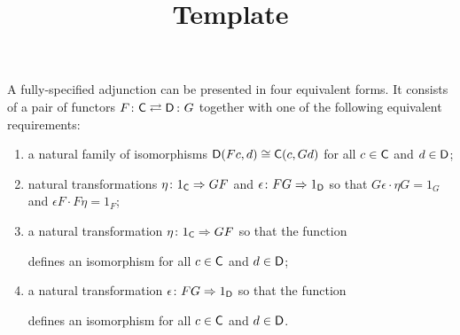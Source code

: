 \documentclass[../../solutions]{subfiles}
\title{Template}
\author{}
\begin{document}
\maketitle

\begin{remark}
  A fully-specified adjunction can be presented in four equivalent
  forms.  It consists of a pair of functors $\afunc{F}{G}{\sC}{\sD}$
  together with one of the following equivalent requirements:
  \begin{enumerate}[label=(\roman*)]
  \item a natural family of isomorphisms ${\mathsf{D}}(Fc,d)\cong {\mathsf{C}}(c,Gd)$
    for all $c\in{\mathsf{C}}$ and $d\in{\mathsf{D}}$;
  \item natural transformations ${\eta}\colon{1_{\mathsf{C}}}\Rightarrow{GF}$ and
    ${\epsilon}\colon{FG}\Rightarrow{1_{\mathsf{D}}}$ so that $G\epsilon\cdot\eta G=1_G$
    and $\epsilon F\cdot F\eta = 1_F$;
  \item a natural transformation ${\eta}\colon{1_{\mathsf{C}}}\Rightarrow{GF}$ so that the
    function
    \begin{center}
    \end{center}
    defines an isomorphism for all $c\in{\mathsf{C}}$ and $d\in{\mathsf{D}}$;
  \item a natural transformation ${\epsilon}\colon{FG}\Rightarrow{1_{\mathsf{D}}}$ so that
    the function
    \begin{center}
    \end{center}
    defines an isomorphism for all $c\in{\mathsf{C}}$ and $d\in{\mathsf{D}}$.
  \end{enumerate}
\end{remark}
\popthm
\end{document}
